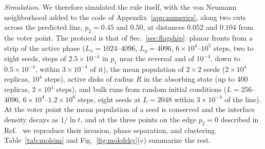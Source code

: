 \documentclass[pre,twocolumn,superscriptaddress,showpacs,floatfix]{revtex4-2}
\begin{document}
\textit{Simulation.} We therefore simulated the rule itself, with the von Neumann neighborhood
added to the code of Appendix~\ref{app:numerics}, along two cuts across the predicted line,
$p_2 = 0.45$ and $0.50$, at distances $0.052$ and $0.104$ from the voter point. The protocol is
that of Sec.~\ref{sec:flagship}: planar fronts from a strip of the active phase ($L_x = 1024$--4096,
$L_y = 4096$, $6\times10^4$--$10^5$ steps, two to eight seeds, steps of $2.5\times10^{-4}$ in
$p_1$ near the reversal and of $10^{-4}$, down to $0.5\times10^{-4}$, within $3\times10^{-4}$ of
it), the mean population of $2\times2$ seeds ($2\times10^4$ replicas, $10^4$
steps), active disks of radius $R$ in the absorbing state (up to 400 replicas, $2\times10^4$
steps), and bulk runs from random initial conditions ($L = 256$--4096, $6\times10^4$--$1.2\times10^6$
steps, eight seeds at $L = 2048$ within $3\times10^{-4}$ of the line). At the voter point the mean population of a seed is conserved and the interface density
decays as $1/\ln t$, and at the three points on the edge $p_2 = 0$ described in
Ref.~\cite{molofsky1999} we reproduce their invasion, phase separation, and clustering.
Table~\ref{tab:molsim} and Fig.~\ref{fig:molofsky}(c) summarize the rest.
\end{document}
